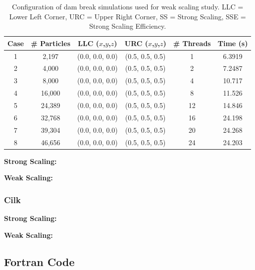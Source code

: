 \documentclass{scrartcl}
\begin{document}
    \begin{table}
    	\begin{center}
        \begin{tabular}{| c | c | c | c | c | c |}
            \hline
            Case & \# Particles & LLC ($x$,$y$,$z$) & URC ($x$,$y$,$z$) & \# Threads & Time (s) \\ \hline
            1 &  2,197 & (0.0, 0.0, 0.0) & (0.5, 0.5, 0.5) &  1 & 6.3919  \\ \hline		  		
            2 &  4,000 & (0.0, 0.0, 0.0) & (0.5, 0.5, 0.5) &  2 & 7.2487 \\ \hline		  		
            3 &  8,000 & (0.0, 0.0, 0.0) & (0.5, 0.5, 0.5) &  4 & 10.717 \\ \hline		  		
            4 & 16,000 & (0.0, 0.0, 0.0) & (0.5, 0.5, 0.5) &  8 & 11.526 \\ \hline		  		
            5 & 24,389 & (0.0, 0.0, 0.0) & (0.5, 0.5, 0.5) & 12 & 14.846 \\ \hline		  		
            6 & 32,768 & (0.0, 0.0, 0.0) & (0.5, 0.5, 0.5) & 16 & 24.198 \\ \hline		  		
            7 & 39,304 & (0.0, 0.0, 0.0) & (0.5, 0.5, 0.5) & 20 & 24.268 \\ \hline		  		
            8 & 46,656 & (0.0, 0.0, 0.0) & (0.5, 0.5, 0.5) & 24 & 24.203 \\ \hline		  		
        \end{tabular}
        \caption{Configuration of dam break simulations used for weak scaling study. LLC = Lower Left Corner, URC = Upper Right Corner, SS = Strong Scaling, SSE = Strong Scaling Efficiency.}
        \label{tab:ws}
        \end{center}
    \end{table}
  
    \textbf{Strong Scaling:}
    
    \textbf{Weak Scaling:}
    
  \subsubsection{Cilk}
  \textbf{Strong Scaling:}
  
  \textbf{Weak Scaling:}
  \subsection{Fortran Code}    
  
\end{document}

